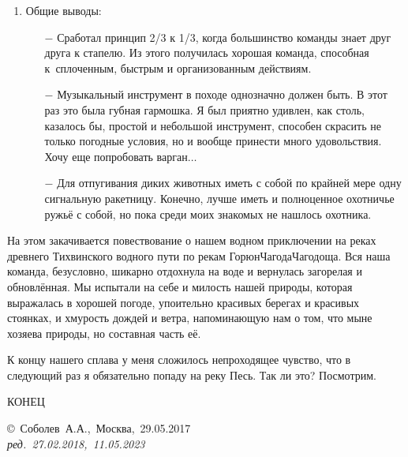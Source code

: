 \begin{enumerate}
\begin{enumerate}
	\end{enumerate}
\item Общие выводы:
	\begin{enumerate}
		\item[$-$] Сработал принцип 2/3 к 1/3, когда большинство команды знает друг друга к стапелю. Из этого получилась хорошая команда, способная к~сплоченным, быстрым и организованным действиям.
		\item[$-$] Музыкальный инструмент в походе однозначно должен быть. В этот раз это была губная гармошка. Я был приятно удивлен, как столь, казалось бы, простой и небольшой инструмент, способен скрасить не только погодные условия, но и вообще принести много удовольствия. Хочу еще попробовать варган$\ldots$
		\item[$-$] Для отпугивания диких животных иметь с собой по крайней мере одну сигнальную ракетницу. Конечно, лучше иметь и полноценное охотничье ружьё с собой, но пока среди моих знакомых не нашлось охотника.
	\end{enumerate}
\end{enumerate}	

На этом закачивается повествование о нашем водном приключении на реках древнего Тихвинского водного пути по рекам Горюн\sdash Чагода\sdash Чагодоща. Вся наша команда, безусловно, шикарно отдохнула на воде и вернулась загорелая и обновлённая. Мы испытали на себе и милость нашей природы, которая выражалась в хорошей погоде, упоительно красивых берегах и красивых стоянках, и хмурость дождей и ветра, напоминающую нам о том, что мы\mdash не хозяева природы, но составная часть её.

К концу нашего сплава у меня сложилось непроходящее чувство, что в следующий раз я обязательно попаду на реку Песь. Так ли это? Посмотрим.

\begin{center}
\end{center}

\begin{center}
	\Large {КОНЕЦ}
\end{center}
\vspace{\fill}
\begin{flushright}
	\copyright~Соболев~А.А.,~Москва,~29.05.2017\\
	\textit{ред.~27.02.2018,~11.05.2023}
\end{flushright}